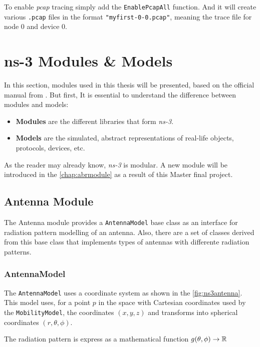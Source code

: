 To enable \textit{pcap} tracing simply add the \texttt{EnablePcapAll} function.
And it will create various \texttt{.pcap} files in the format \texttt{"myfirst-0-0.pcap"}, meaning
the trace file for node 0 and device 0.

\section{ns-3 Modules \& Models}
In this section, modules used in this thesis will be presented, based on the official
manual from \cite{ns3}. But first, It is 
essential to understand the difference between modules and models:

\begin{itemize}[itemsep=0pt, topsep=0pt]
  \item \textbf{Modules} are the different libraries that form \textit{ns-3}.
  \item \textbf{Models} are the simulated, abstract representations of real-life objects,
  protocols, devices, etc.
\end{itemize}

As the reader may already know, \textit{ns-3} is modular. A new module will be introduced in 
the \autoref{chap:abrmodule} as a result of this Master final project.

\subsection{Antenna Module}
The Antenna module provides a \texttt{AntennaModel} base class as an interface for radiation
pattern modelling of an antenna. Also, there are a set of classes derived from this base
class that implements types of antennas with differente radiation patterns.

\subsubsection{AntennaModel}
The \texttt{AntennaModel} uses a coordinate system as shown in the \autoref{fig:ns3antenna}. This
model uses, for a point ${p}$ in the space with Cartesian coordinates used by the \texttt{MobilityModel},
the coordinates ${(x,y,z)}$ and transforms into spherical coordinates ${(r,\theta,\phi)}$.

The radiation pattern is express as a mathematical function ${g(\theta,\phi) \rightarrow \mathbb{R}}$

